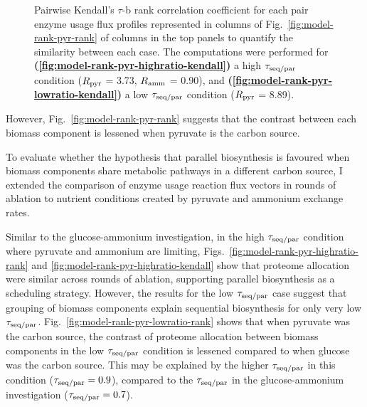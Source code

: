 \begin{figure}
  \caption[
    Pairwise Kendall's $\tau$-b rank correlation coefficient (pyruvate-ammonium)
  ]{
    Pairwise Kendall's $\tau$-b rank correlation coefficient \parencite{kendallTREATMENTTIESRANKING1945} for each pair enzyme usage flux profiles represented in columns of Fig.\ \ref{fig:model-rank-pyr-rank} of columns in the top panels to quantify the similarity between each case.
    The computations were performed for \textbf{(\ref{fig:model-rank-pyr-highratio-kendall})} a high $\tau_{\mathrm{seq}/\mathrm{par}}$ condition ($R_{\mathrm{pyr}}$ = \SI{3.73}{\mmolgdwh}, $R_{\mathrm{amm}}$ = \SI{0.90}{\mmolgdwh}), and \textbf{(\ref{fig:model-rank-pyr-lowratio-kendall})} a low $\tau_{\mathrm{seq}/\mathrm{par}}$ condition ($R_{\mathrm{pyr}}$ = \SI{8.89}{\mmolgdwh}).
  }
  \label{fig:model-rank-pyr-kendall}
\end{figure}

However, Fig.\ \ref{fig:model-rank-pyr-rank} suggests that the contrast between each biomass component is lessened when pyruvate is the carbon source.

To evaluate whether the hypothesis that parallel biosynthesis is favoured when biomass components share metabolic pathways in a different carbon source, I extended the comparison of enzyme usage reaction flux vectors in rounds of ablation to nutrient conditions created by pyruvate and ammonium exchange rates.

Similar to the glucose-ammonium investigation, in the high $\tau_{\mathrm{seq}/\mathrm{par}}$ condition where pyruvate and ammonium are limiting, Figs.\ \ref{fig:model-rank-pyr-highratio-rank} and \ref{fig:model-rank-pyr-highratio-kendall} show that proteome allocation were similar across rounds of ablation, supporting parallel biosynthesis as a scheduling strategy.
However, the results for the low $\tau_{\mathrm{seq}/\mathrm{par}}$ case suggest that grouping of biomass components explain sequential biosynthesis for only very low $\tau_{\mathrm{seq}/\mathrm{par}}$.
Fig.\ \ref{fig:model-rank-pyr-lowratio-rank} shows that when pyruvate was the carbon source, the contrast of proteome allocation between biomass components in the low $\tau_{\mathrm{seq}/\mathrm{par}}$ condition is lessened compared to when glucose was the carbon source.
This may be explained by the higher $\tau_{\mathrm{seq}/\mathrm{par}}$ in this condition ($\tau_{\mathrm{seq}/\mathrm{par}} = 0.9$), compared to the $\tau_{\mathrm{seq}/\mathrm{par}}$ in the glucose-ammonium investigation ($\tau_{\mathrm{seq}/\mathrm{par}} = 0.7$).

